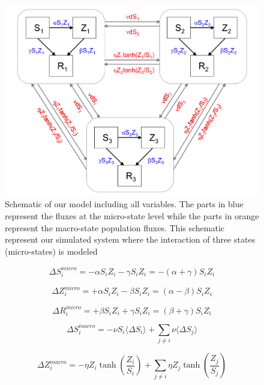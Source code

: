 \documentclass[11pt]{article} %
\begin{document}
\begin{figure}[h!]
\centerline{
\includegraphics[scale=0.15]{Images/Zombie_model.png}}
\caption{Schematic of our model including all variables. The parts in blue represent the fluxes at the micro-state level while the parts in orange represent the macro-state population fluxes. This schematic represent our simulated system where the interaction of three states (micro-states) is modeled \label{overallmodel} }
\end{figure}

\begin{equation}  \label{eq:smicro}
\Delta S_{i}^{micro} = -\alpha S_{i} Z_{i} -\gamma S_{i} Z_{i} = -(\alpha + \gamma) S_{i} Z_{i}
\end{equation}

\begin{equation} \label{eq:zmicro}
\Delta Z_{i}^{micro} = +\alpha S_{i} Z_{i} - \beta S_{i} Z_{i} = (\alpha - \beta) S_{i} Z_{i}
\end{equation}

\begin{equation} \label{eq:rmicro}
\Delta R_{i}^{micro} = +\beta S_{i} Z_{i} + \gamma S_{i} Z_{i} = (\beta + \gamma) S_{i} Z_{i}
\end{equation}

\begin{equation} \label{eq:smacro}
\Delta S_{i}^{macro} = -\nu S_{i} \langle \Delta S_{i} \rangle + \sum_{j\neq i}{\nu \langle \Delta S_{j} \rangle }
\end{equation}

\begin{equation} \label{eq:zmacro}
\Delta Z_{i}^{macro} = -\eta Z_{i}\tanh \left( \frac{Z_{i}}{S_{i}}\right) + \sum_{j\neq i}{\eta Z_{j}\tanh \left( \frac{Z_{j}}{S_{j}}\right)}
\end{equation}
\end{document}
